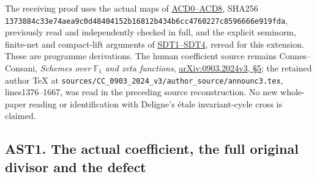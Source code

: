 The receiving proof uses the actual maps of
\href{https://github.com/KokunoYumeto/zeta-function-research-reader/blob/main/workbenches/splitzero-tandem/continuations/20260925-source-endpoint-and-section/CC_ADJOINT_DEFECT_CONTINUOUS_DUAL.md}{ACD0--ACD8}, SHA256
\nolinkurl{1373884c33e74aea9c0d48404152b16812b434b6cc4760227c8596666e919fda},
previously read and independently checked in full, and the explicit
seminorm, finite-net and compact-lift arguments of
\href{https://github.com/KokunoYumeto/zeta-function-research-reader/blob/96b02efaf4511d07f33de5ea4cfb10058e905d7e/workbenches/splitzero-tandem/continuations/20260924-cohomology-weight-and-character-lifts/gct-weight-control/proofs/CC_STRONG_DUAL_TOPOLOGY_AND_JETS.md}{SDT1--SDT4}, reread for this
extension. These are programme derivations. The human coefficient source
remains Connes--Consani, \emph{Schemes over} \(\mathbb F_1\) \emph{and
zeta functions},
\href{https://arxiv.org/abs/0903.2024v3}{arXiv:0903.2024v3, §5}; the
retained author TeX at
\nolinkurl{sources/CC_0903_2024_v3/author_source/announc3.tex},
lines1376--1667, was read in the preceding source reconstruction. No new
whole-paper reading or identification with Deligne's étale
invariant-cycle cross is claimed.

\subsection{AST1. The actual coefficient, the full original divisor and
the
defect}\label{ast1.-the-actual-coefficient-the-full-original-divisor-and-the-defect}

